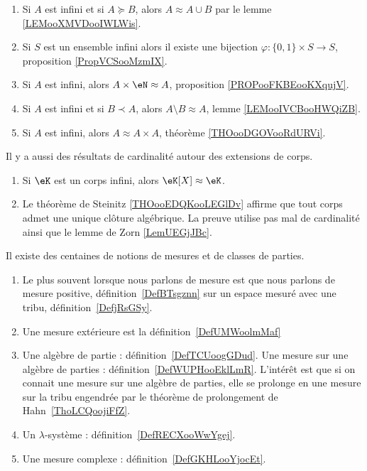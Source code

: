 \begin{enumerate}
\item 
    Si \( A\) est infini et si \( A\succeq B\), alors \( A\approx A\cup B\) par le lemme \ref{LEMooXMVDooIWLWis}.
\item
    Si \( S\) est un ensemble infini alors il existe une bijection \( \varphi\colon \{ 0,1 \}\times S\to S\), proposition \ref{PropVCSooMzmIX}.
\item
    Si \( A\) est infini, alors \( A\times \eN\approx A\), proposition \ref{PROPooFKBEooKXqujV}.
\item 
    Si \( A\) est infini et si \( B\prec A\), alors \( A\setminus B\approx A\), lemme \ref{LEMooIVCBooHWQiZB}.
\item
    Si \( A\) est infini, alors \( A\approx A\times A\), théorème \ref{THOooDGOVooRdURVi}.
\end{enumerate}

Il y a aussi des résultats de cardinalité autour des extensions de corps.
\begin{enumerate}
    \item
        Si \( \eK\) est un corps infini, alors \( \eK[X]\approx \eK\).
    \item
        Le théorème de Steinitz \ref{THOooEDQKooLEGlDv} affirme que tout corps admet une unique clôture algébrique. La preuve utilise pas mal de cardinalité ainsi que le lemme de Zorn \ref{LemUEGjJBc}.
\end{enumerate}

  \label{INTooVDSCooHXLLKp}
    Il existe des centaines de notions de mesures et de classes de parties.
\begin{enumerate}
        \item
            Le plus souvent lorsque nous parlons de mesure est que nous parlons de mesure positive, définition~\ref{DefBTsgznn} sur un espace mesuré avec une tribu, définition~\ref{DefjRsGSy}.
        \item
            Une mesure extérieure est la définition~\ref{DefUMWoolmMaf}
        \item
            Une algèbre de partie : définition~\ref{DefTCUoogGDud}. Une mesure sur une algèbre de parties : définition~\ref{DefWUPHooEklLmR}. L'intérêt est que si on connait une mesure sur une algèbre de parties, elle se prolonge en une mesure sur la tribu engendrée par le théorème de prolongement de Hahn~\ref{ThoLCQoojiFfZ}.
        \item
            Un \( \lambda\)-système : définition~\ref{DefRECXooWwYgej}.
        \item
            Une mesure complexe : définition~\ref{DefGKHLooYjocEt}.
\end{enumerate}

